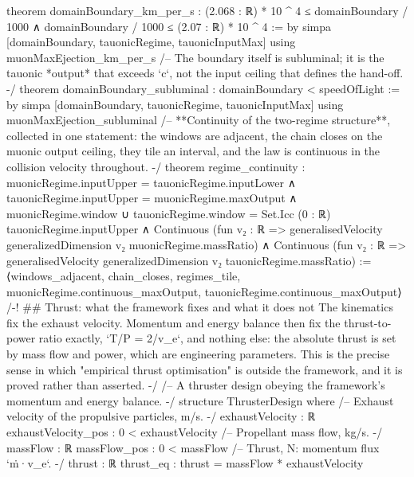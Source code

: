 \documentclass[11pt,a4paper]{article}
\begin{document}
{theorem domainBoundary\_\allowbreak{}km\_\allowbreak{}per\_\allowbreak{}s :
    (2.068 : ℝ) * 10 \textasciicircum{} 4 ≤ domainBoundary / 1000 ∧
      domainBoundary / 1000 ≤ (2.07 : ℝ) * 10 \textasciicircum{} 4 := by
  simpa [domainBoundary, tauonicRegime, tauonicInputMax] using muonMaxEjection\_\allowbreak{}km\_\allowbreak{}per\_\allowbreak{}s
\mbox{}
/-- The boundary itself is subluminal; it is the tauonic *output* that exceeds
`c`, not the input ceiling that defines the hand-off. -/
theorem domainBoundary\_\allowbreak{}subluminal : domainBoundary \textless{} speedOfLight := by
  simpa [domainBoundary, tauonicRegime, tauonicInputMax] using muonMaxEjection\_\allowbreak{}subluminal
\mbox{}
/-- **Continuity of the two-regime structure**, collected in one statement: the
windows are adjacent, the chain closes on the muonic output ceiling, they tile
an interval, and the law is continuous in the collision velocity throughout. -/
theorem regime\_\allowbreak{}continuity :
    muonicRegime.inputUpper = tauonicRegime.inputLower ∧
      tauonicRegime.inputUpper = muonicRegime.maxOutput ∧
      muonicRegime.window ∪ tauonicRegime.window
        = Set.Icc (0 : ℝ) tauonicRegime.inputUpper ∧
      Continuous (fun v₂ : ℝ =\textgreater{}
        generalisedVelocity generalizedDimension v₂ muonicRegime.massRatio) ∧
      Continuous (fun v₂ : ℝ =\textgreater{}
        generalisedVelocity generalizedDimension v₂ tauonicRegime.massRatio) :=
  ⟨windows\_\allowbreak{}adjacent, chain\_\allowbreak{}closes, regimes\_\allowbreak{}tile,
    muonicRegime.continuous\_\allowbreak{}maxOutput, tauonicRegime.continuous\_\allowbreak{}maxOutput⟩
\mbox{}
/-! \#\# Thrust: what the framework fixes and what it does not
\mbox{}
The kinematics fix the exhaust velocity.  Momentum and energy balance then fix
the thrust-to-power ratio exactly, `T/P = 2/v\_\allowbreak{}e`, and nothing else: the absolute
thrust is set by mass flow and power, which are engineering parameters.  This is
the precise sense in which "empirical thrust optimisation" is outside the
framework, and it is proved rather than asserted.
-/
\mbox{}
/-- A thruster design obeying the framework's momentum and energy balance. -/
structure ThrusterDesign where
  /-- Exhaust velocity of the propulsive particles, m/s. -/
  exhaustVelocity : ℝ
  exhaustVelocity\_\allowbreak{}pos : 0 \textless{} exhaustVelocity
  /-- Propellant mass flow, kg/s. -/
  massFlow : ℝ
  massFlow\_\allowbreak{}pos : 0 \textless{} massFlow
  /-- Thrust, N: momentum flux `ṁ·v\_\allowbreak{}e`. -/
  thrust : ℝ
  thrust\_\allowbreak{}eq : thrust = massFlow * exhaustVelocity
}
\end{document}
